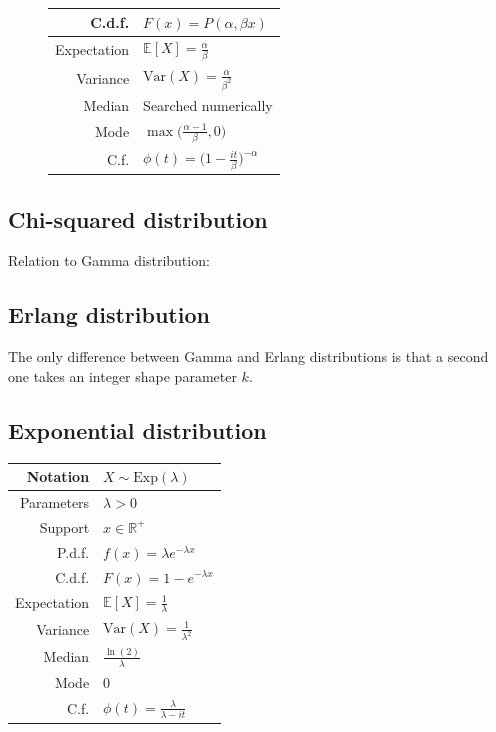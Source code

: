 \documentclass[a4paper,11pt]{article}
\theoremstyle{plain}
\theoremstyle{definition}
\newcommand{\ME}{\mathbb{E}}
\newcommand{\MR}{\mathbb{R}}
\newcommand{\Var}{\mathrm{Var}}
\begin{document}
\begin{figure}[!htb]
\begin{minipage}{0.4\textwidth}
\begin{tabular}{| r | l |}
				\hline
				C.d.f. & $F(x)=P(\alpha, \beta x) $\\
				\hline
				Expectation & $\ME[X] = \frac{\alpha}{\beta}$ \\
				\hline
				Variance & $\Var(X) = \frac{\alpha}{\beta^2}$ \\
				\hline
				Median & Searched numerically \\
				\hline
				Mode & $\max\big(\frac{\alpha - 1}{\beta}, 0\big)$ \\
				\hline
				C.f. & $\phi(t) = \Big( 1-\frac{it}{\beta} \Big)^{-\alpha}$ \\
				\hline
			\end{tabular}
		\end{minipage}
	\end{figure}
	\subsection{Chi-squared distribution}
	Relation to Gamma distribution:
	\subsection{Erlang distribution}
	The only difference between Gamma and Erlang distributions is that a second one takes an integer shape parameter $k$.
	\subsection{Exponential distribution}
	\begin{center}
		\begin{tabular}{| r | l |}
			\hline
			Notation & $X \sim \mathrm{Exp}(\lambda)$ \\
			\hline
			Parameters & $\lambda > 0$ \\
			\hline
			Support & $x \in \MR^+$  \\
			\hline
			P.d.f. & $f(x) = \lambda e^{-\lambda x}  $ \\
			\hline
			C.d.f. & $F(x)=1-e^{-\lambda x} $\\
			\hline
			Expectation & $\ME[X] = \frac{1}{\lambda}$ \\
			\hline
			Variance & $\Var(X) = \frac{1}{\lambda^2}$ \\
			\hline
			Median & $\frac{\ln(2)}{\lambda}$ \\
			\hline
			Mode & $0$ \\
			\hline
			C.f. & $\phi(t) = \frac{\lambda}{\lambda-it}$ \\
			\hline
		\end{tabular}
	\end{center}
	
\end{document}
